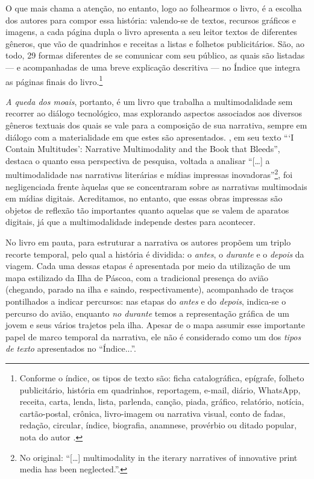 \documentclass[portuguese]{textolivre}
\begin{document}
O que mais chama a atenção, no entanto, logo ao folhearmos o livro, é a escolha
dos autores para compor essa história: valendo-se de textos, recursos gráficos
e imagens, a cada página dupla o livro apresenta a seu leitor textos de
diferentes gêneros, que vão de quadrinhos e receitas a listas e folhetos
publicitários. São, ao todo, 29 formas diferentes de se comunicar com seu
público, as quais são listadas — e acompanhadas de uma breve explicação
descritiva — no Índice que integra as páginas finais do
livro.\footnote{Conforme o índice, os tipos de texto são: ficha catalográfica,
epígrafe, folheto publicitário, história em quadrinhos, reportagem, e-mail,
diário, WhatsApp, receita, carta, lenda, lista, parlenda, canção, piada,
gráfico, relatório, notícia, cartão-postal, crônica, livro-imagem ou narrativa
visual, conto de fadas, redação, circular, índice, biografia, anamnese,
provérbio ou ditado popular, nota do autor \cite[p.~56-59]{franco_queda_2018}.} 

\textit{A queda dos moais}, portanto, é um livro que trabalha a multimodalidade
sem recorrer ao diálogo tecnológico, mas explorando aspectos associados aos
diversos gêneros textuais dos quais se vale para a composição de sua narrativa,
sempre em diálogo com a materialidade em que estes são apresentados.
\textcite{gibbons_i_2010}, em seu texto “‘I Contain Multitudes’: Narrative
Multimodality and the Book that Bleeds”, destaca o quanto essa perspectiva de
pesquisa, voltada a analisar “[…] a multimodalidade nas narrativas literárias
e mídias impressas inovadoras”\footnote{No original: “[…] multimodality in the
iterary narratives of innovative print media has been neglected.”.}, foi
negligenciada frente àquelas que se concentraram sobre as narrativas
multimodais em mídias digitais. Acreditamos, no entanto, que essas obras
impressas são objetos de reflexão tão importantes quanto aquelas que se valem
de aparatos digitais, já que a multimodalidade independe destes para acontecer.

No livro em pauta, para estruturar a narrativa os autores propõem um triplo
recorte temporal, pelo qual a história é dividida: o \textit{antes}, o
\textit{durante} e o \textit{depois} da viagem. Cada uma dessas etapas é
apresentada por meio da utilização de um mapa estilizado da Ilha de Páscoa, com
a tradicional presença do avião (chegando, parado na ilha e saindo,
respectivamente), acompanhado de traços pontilhados a indicar percursos: nas
etapas do \textit{antes} e do \textit{depois}, indica-se o percurso do avião,
enquanto \textit{no durante} temos a representação gráfica de um jovem e seus
vários trajetos pela ilha. Apesar de o mapa assumir esse importante papel de
marco temporal da narrativa, ele não é considerado como um dos \textit{tipos de
texto} apresentados no “Índice...”.
\end{document}
